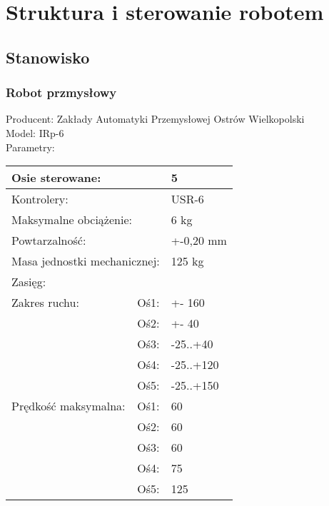\chapter{Struktura i sterowanie robotem}
\label{cha:strukturaISterowanie}

\section{Stanowisko}
\label{sec:stanowisko}

\subsection{Robot przmysłowy}
\label{sebsec:RobotPrzemyslowy}
\noindent Producent: Zakłady Automatyki Przemysłowej Ostrów Wielkopolski\\
Model: IRp-6\\
Parametry:\\
\begin{tabular}{|l|l|l|} \hline
\multicolumn{2}{|l|}{Osie sterowane: }& {5} \\ \hline
\multicolumn{2}{|l|}{Kontrolery: }& {USR-6}\\ \hline
\multicolumn{2}{|l|}{Maksymalne obciążenie: } & {6 kg}\\ \hline
\multicolumn{2}{|l|}{Powtarzalność: }& {+-0,20 mm}\\ \hline
\multicolumn{2}{|l|}{Masa jednostki mechanicznej: }& {125 kg}\\ \hline
\multicolumn{2}{|l|}{Zasięg: }& \\ \hline
{Zakres ruchu:} & {Oś1:} & {+- 160} \\ \cline{2-3}
& Oś2: & +- 40 \\ \cline{2-3}
& Oś3: & -25..+40\\ \cline{2-3}
& Oś4: & -25..+120\\ \cline{2-3}
& Oś5: & -25..+150\\ \hline
Prędkość maksymalna: & Oś1: & 60 \\ \cline{2-3}
& Oś2: & 60 \\ \cline{2-3}
& Oś3: & 60 \\ \cline{2-3}
& Oś4: & 75 \\ \cline{2-3}
& Oś5: & 125\\ \hline
\end{tabular}

